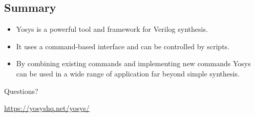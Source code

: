 
\subsection{Summary}

\begin{frame}{\subsecname}
\begin{itemize}
\item Yosys is a powerful tool and framework for Verilog synthesis.
\item It uses a command-based interface and can be controlled by scripts.
\item By combining existing commands and implementing new commands Yosys can
be used in a wide range of application far beyond simple synthesis.
\end{itemize}

\bigskip
\bigskip
\begin{center}
Questions?
\end{center}

\bigskip
\bigskip
\begin{center}
\url{https://yosyshq.net/yosys/}
\end{center}
\end{frame}

